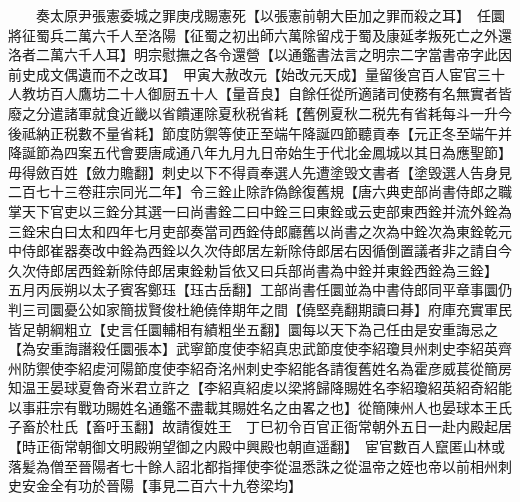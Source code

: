 　　奏太原尹張憲委城之罪庚戌賜憲死【以張憲前朝大臣加之罪而殺之耳】　任圜將征蜀兵二萬六千人至洛陽【征蜀之初出師六萬除留戍于蜀及康延孝叛死亡之外還洛者二萬六千人耳】明宗慰撫之各令還營【以通鑑書法言之明宗二字當書帝字此因前史成文偶遺而不之改耳】　甲寅大赦改元【始改元天成】量留後宫百人宦官三十人教坊百人鷹坊二十人御厨五十人【量音良】自餘任從所適諸司使務有名無實者皆廢之分遣諸軍就食近畿以省饋運除夏秋税省耗【舊例夏秋二税先有省耗每斗一升今後祗納正税數不量省耗】節度防禦等使正至端午降誕四節聽貢奉【元正冬至端午并降誕節為四案五代會要唐咸通八年九月九日帝始生于代北金鳳城以其日為應聖節】毋得斂百姓【斂力贍翻】刺史以下不得貢奉選人先遭塗毁文書者【塗毁選人告身見二百七十三卷莊宗同光二年】令三銓止除詐偽餘復舊規【唐六典吏部尚書侍郎之職掌天下官吏以三銓分其選一曰尚書銓二曰中銓三曰東銓或云吏部東西銓并流外銓為三銓宋白曰太和四年七月吏部奏當司西銓侍郎廳舊以尚書之次為中銓次為東銓乾元中侍郎崔器奏改中銓為西銓以久次侍郎居左新除侍郎居右因循倒置議者非之請自今久次侍郎居西銓新除侍郎居東銓勅旨依又曰兵部尚書為中銓并東銓西銓為三銓】　五月丙辰朔以太子賓客鄭珏【珏古岳翻】工部尚書任圜並為中書侍郎同平章事圜仍判三司圜憂公如家簡拔賢俊杜絶僥倖期年之間【僥堅堯翻期讀曰朞】府庫充實軍民皆足朝綱粗立【史言任圜輔相有績粗坐五翻】圜每以天下為己任由是安重誨忌之【為安重誨譖殺任圜張本】武寧節度使李紹真忠武節度使李紹瓊貝州刺史李紹英齊州防禦使李紹䖍河陽節度使李紹奇洺州刺史李紹能各請復舊姓名為霍彦威萇從簡房知温王晏球夏魯奇米君立許之【李紹真紹䖍以梁將歸降賜姓名李紹瓊紹英紹奇紹能以事莊宗有戰功賜姓名通鑑不盡載其賜姓名之由畧之也】從簡陳州人也晏球本王氏子畜於杜氏【畜吁玉翻】故請復姓王　丁巳初令百官正衙常朝外五日一赴内殿起居【時正衙常朝御文明殿朔望御之内殿中興殿也朝直遥翻】　宦官數百人竄匿山林或落髪為僧至晉陽者七十餘人詔北都指揮使李從温悉誅之從温帝之姪也帝以前相州刺史安金全有功於晉陽【事見二百六十九卷梁均】

